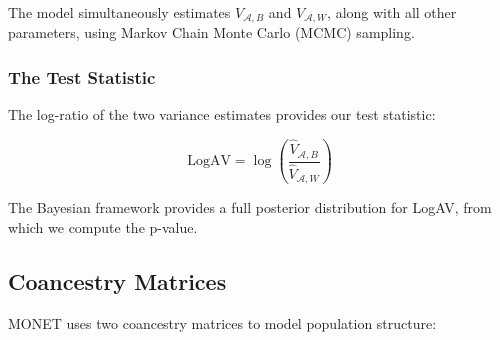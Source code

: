 \documentclass[11pt]{article}
\begin{document}
The model simultaneously estimates $V_{ \mathcal{A},B}$ and $V_{ \mathcal{A},W}$, along with all other parameters, using Markov Chain Monte Carlo (MCMC) sampling.

\subsubsection{The Test Statistic}

The log-ratio of the two variance estimates provides our test statistic:

$$\text{LogAV} = \log\left(\frac{\hat{V}_{ \mathcal{A},B}}{\hat{V}_{ \mathcal{A},W}}\right)$$

The Bayesian framework provides a full posterior distribution for LogAV, from which we compute the p-value.


\subsection{Coancestry Matrices}

MONET uses two coancestry matrices to model population structure:

\end{document}
